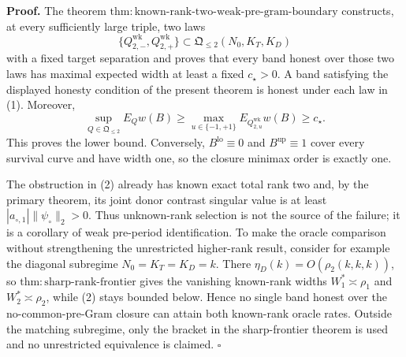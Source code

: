 \textbf{Proof.}
The theorem \(\mathrm{thm:known\mbox{-}rank\mbox{-}two\mbox{-}weak\mbox{-}pre\mbox{-}gram\mbox{-}boundary}\) constructs, at every sufficiently large triple, two laws
\[
 \{Q_{2,-}^{\mathrm{wk}},Q_{2,+}^{\mathrm{wk}}\}
 \subset\mathfrak Q_{\le2}(N_0,K_T,K_D)                  \tag{1}
\]
with a fixed target separation and proves that every band honest over those two laws has maximal expected width at least a fixed \(c_\star>0\).  A band satisfying the displayed honesty condition of the present theorem is honest under each law in (1).  Moreover,
\[
 \sup_{Q\in\mathfrak Q_{\le2}}E_Qw(B)
 \ge\max_{u\in\{-1,+1\}}E_{Q_{2,u}^{\mathrm{wk}}}w(B)
 \ge c_\star.                                             \tag{2}
\]
This proves the lower bound.  Conversely, \(B^{\mathrm{lo}}\equiv0\) and \(B^{\mathrm{up}}\equiv1\) cover every survival curve and have width one, so the closure minimax order is exactly one.

The obstruction in (2) already has known exact total rank two and, by the primary theorem, its joint donor contrast singular value is at least \(|a_{\circ,1}|\|\psi_\circ\|_2>0\).  Thus unknown-rank selection is not the source of the failure; it is a corollary of weak pre-period identification.  To make the oracle comparison without strengthening the unrestricted higher-rank result, consider for example the diagonal subregime \(N_0=K_T=K_D=k\).  There \(\eta_D(k)=O(\rho_2(k,k,k))\), so \(\mathrm{thm:sharp\mbox{-}rank\mbox{-}frontier}\) gives the vanishing known-rank widths \(W_1^*\asymp\rho_1\) and \(W_2^*\asymp\rho_2\), while (2) stays bounded below.  Hence no single band honest over the no-common-pre-Gram closure can attain both known-rank oracle rates.  Outside the matching subregime, only the bracket in the sharp-frontier theorem is used and no unrestricted equivalence is claimed. \(\square\)